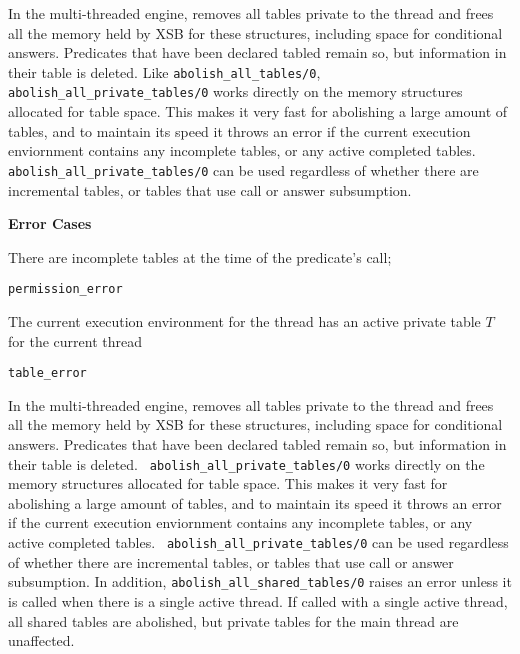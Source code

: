 \begin{description}
\begin{description}
%
In the multi-threaded engine, removes all tables private to the thread
and frees all the memory held by XSB for these structures, including
space for conditional answers.  Predicates that have been declared
tabled remain so, but information in their table is deleted.  Like
{\tt abolish\_all\_tables/0}, {\tt abolish\_all\_private\_tables/0}
works directly on the memory structures allocated for table space.
This makes it very fast for abolishing a large amount of tables, and
to maintain its speed it throws an error if the current execution
enviornment contains any incomplete tables, or any active completed
tables.  {\tt abolish\_all\_private\_tables/0} can be used regardless of
whether there are incremental tables, or tables that use call or
answer subsumption.


{\bf Error Cases}
\bi
\item There are incomplete tables at the time of the predicate's call;
\bi
\item 	{\tt permission\_error}
\ei
\item The current execution environment for the thread has an active
  private table $T$ for the current thread
\bi
\item 	{\tt table\_error}
\ei
%
\ei


%
In the multi-threaded engine, removes all tables private to the thread
and frees all the memory held by XSB for these structures, including
space for conditional answers.  Predicates that have been declared
tabled remain so, but information in their table is deleted.  {\tt
  abolish\_all\_private\_tables/0} works directly on the memory
structures allocated for table space.  This makes it very fast for
abolishing a large amount of tables, and to maintain its speed it
throws an error if the current execution enviornment contains any
incomplete tables, or any active completed tables.  {\tt
  abolish\_all\_private\_tables/0} can be used regardless of whether
there are incremental tables, or tables that use call or answer
subsumption.  In addition, {\tt abolish\_all\_shared\_tables/0} raises
an error unless it is called when there is a single active thread.  If
called with a single active thread, all shared tables are abolished,
but private tables for the main thread are unaffected.



\end{description}
\end{description}

